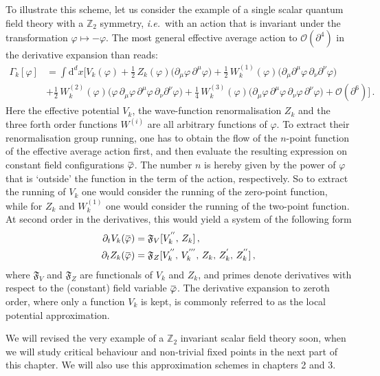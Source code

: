 \documentclass[11pt]{book}
\newcommand{\overbar}[1]{\mkern 1.5mu\overline{\mkern-1.5mu#1\mkern-1.5mu}\mkern 1.5mu}
\newcommand{\bp}{\overbar \varphi}
\newcommand\ie{\textit{i.e.}\ }
\numberwithin{equation}{chapter}
\begin{document}
To illustrate this scheme, let us consider the example of a single
scalar quantum field theory with a $\mathbb Z_2$ symmetry,
\ie with an action that is invariant under the transformation
$\varphi \mapsto -\varphi$. The most general effective
average action to $\mathcal O(\partial^4)$ in the derivative
expansion than reads:
\begin{align}
  \Gamma_k [\varphi] &=
  \int \mathrm d^dx
  \bigg[
    V_k (\varphi)
     + \frac 12 \, Z_k (\varphi) \big( \partial_\mu \varphi \, \partial^\mu \varphi \big)
     + \frac 12 \, W^{(1)}_k (\varphi) \big( \partial_\mu \partial^\mu \varphi \, \partial_\nu \partial^\nu \varphi \big) \\
    &+ \frac 12 \, W^{(2)}_k (\varphi) \big( \varphi \, \partial_\mu \varphi \, \partial^\mu \varphi \, \partial_\nu \partial^\nu \varphi \big)
     + \frac 14 \, W^{(3)}_k (\varphi) \big( \partial_\mu \varphi \, \partial^\mu \varphi \, \partial_\nu \varphi \, \partial^\nu \varphi \big)
     + \mathcal O (\partial ^6)
  \bigg] \,.
\end{align}
Here the effective potential $V_k$, the wave-function renormalisation
$Z_k$ and the three forth order functions $W^{(i)}$ are all
arbitrary functions of $\varphi$. To extract their renormalisation
group running, one has to obtain the flow of the $n$-point
function of the effective average action first, and then evaluate
the resulting expression on constant field configurations $\bp$.
The number $n$ is hereby given by the power of $\varphi$ that is
`outside' the function in the term of the action, respectively.
So to extract the running of $V_k$ one would consider the running
of the zero-point function, while for $Z_k$ and $W^{(1)}_k$ one would
consider the running of the two-point function.
At second order in the derivatives, this would yield a system
of the following form
\begin{align}
  \partial_t V_k(\bp) &= \mathfrak F_V [ V_k^{''}, \, Z_k ] \,, \\
  \partial_t Z_k(\bp) &= \mathfrak F_Z [ V_k^{''}, \, V_k^{'''}, \,
  Z_k, \, Z_k^{'}, \, Z_k^{''} ] \,,
\end{align}
where $\mathfrak F_V$ and $\mathfrak F_Z$ are functionals of $V_k$
and $Z_k$, and primes denote derivatives with respect to the
(constant) field variable $\bp$. The derivative expansion to zeroth order,
where only a function $V_k$ is kept, is commonly referred to as the
local potential approximation.

We will revised the very example of a $\mathbb Z_2$ invariant scalar
field theory soon, when we will study critical behaviour and non-trivial fixed points
in the next part of this chapter. We will also use this
approximation schemes in chapters 2 and 3.
\end{document}
